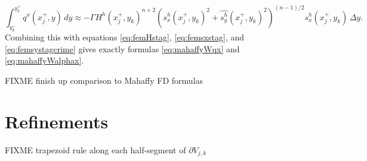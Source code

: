 \documentclass[11pt]{amsart}
\begin{document}
\begin{equation}
\int_{y_k^-}^{y_k^+} q^x(x_j^+,y)\,dy \approx - \Gamma H^h(x_j^+,y_k)^{n+2} \left(s^h_x(x_j^+,y_k)^2 + \widehat{s^h_y}(x_j^+,y_k)^2\right)^{(n-1)/2} s^h_x(x_j^+,y_k)\,\Delta y.
\end{equation}
Combining this with equations \eqref{eq:femHstag}, \eqref{eq:femsxstag}, and \eqref{eq:femsystagcrime} gives exactly formulas \eqref{eq:mahaffyWqx} and \eqref{eq:mahaffyWalphax}.

FIXME finish up comparison to Mahaffy FD formulas

\section{Refinements}

FIXME trapezoid rule along each half-segment of  $\partial V_{j,k}$






\begin{comment}
Here is what the MPAS Land-Ice User's Manual version 3.0 says:

\begin{quote}
\small
Velocities and fluxes are calculated on the midpoint of Voronoi cell edges.  The normal component of surface slope is calculated on cell edges using surface elevation at adjacent cell centers.  The tangential component of surface slope is calculated on cell edges using surface elevation at adjacent vertices. The surface elevation at vertices is calculated from the values at adjacent cell centers using barycentric interpolation. Ice thickness on edges is calculated as the average of the adjacent cell center values (2nd-order approximation).
\end{quote}

Looking at this, and the code, I don't think they think of it as Petrov-Galerkin
\end{comment}
\end{document}
